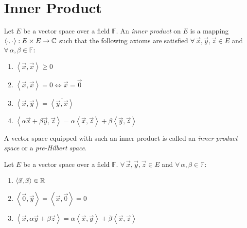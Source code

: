 \documentclass[letterpaper,12pt,fleqn]{article}
\newcommand{\F}{\mathbb{F}}
\newcommand{\inner}[2]{\left<#1,#2\right>}
\newcommand{\conj}[1]{\overline{#1}}
\newcommand{\vx}{\vec{x}}
\newcommand{\vy}{\vec{y}}
\newcommand{\vz}{\vec{z}}
\newcommand{\vo}{\vec{0}}
\renewcommand{\a}{\alpha}
\renewcommand{\b}{\beta}
\begin{document}
\section*{Inner Product}

\begin{definition}
  Let $E$ be a vector space over a field $\F$. An \emph{inner product} on $E$
  is a mapping $\inner{\cdot}{\cdot}:E\times E\to\C$ such that the following
  axioms are satisfied $\forall\,\vx,\vy,\vz\in E$ and $\forall\,\a,\b\in\F$:
  \begin{enumerate}
  \item $\inner{\vx}{\vx}\ge0$
  \item $\inner{\vx}{\vx}=0\iff\vx=\vo$
  \item $\inner{\vx}{\vy}=\conj{\inner{\vy}{\vx}}$
  \item $\inner{\a\vx+\b\vy}{\vz}=\a\inner{\vx}{\vz}+\b\inner{\vy}{\vz}$
  \end{enumerate}
  A vector space equipped with such an inner product is called an
  \emph{inner product space} or a \emph{pre-Hilbert space}.
\end{definition}

\begin{properties}
  Let $E$ be a vector space over a field $\F$. $\forall\,\vx,\vy,\vz\in E$ and
  $\forall\,\a,\b\in\F$:
  \begin{enumerate}
  \item $\inner{\vx}{\vx}\in\R$
  \item $\inner{\vo}{\vy}=\inner{\vx}{\vo}=0$
  \item $\inner{\vx}{\a\vy+\b\vz}=
    \conj{\a}\inner{\vx}{\vy}+\conj{\b}\inner{\vx}{\vz}$
  \end{enumerate}
\end{properties}
\end{document}
